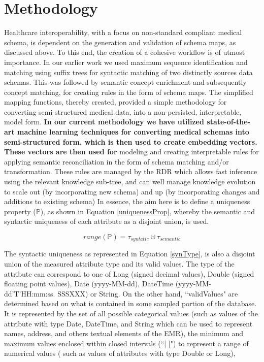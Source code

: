 
\section*{Methodology}
\label{methodology}
Healthcare interoperability, with a focus on non-standard compliant medical schema, is dependent on the generation and validation of schema maps, as discussed above. To this end, the creation of a cohesive workflow is of utmost importance. In our earlier work \cite{Satti2020} we used maximum sequence identification and matching using suffix trees for syntactic matching of two distinctly sources data schemas. This was followed by semantic concept enrichment and subsequently concept matching, for creating rules in the form of schema maps. The simplified mapping functions, thereby created, provided a simple methodology for converting semi-structured medical data, into a non-persisted, interpretable, model form.
\textbf{In our current methodology we have utilized state-of-the-art machine learning techniques for converting medical schemas into semi-structured form, which is then used to create embedding vectors. These vectors are then used for} modeling and creating interpretable rules for applying semantic reconciliation in the form of schema matching and/or transformation. These rules are managed by the RDR which allows fast inference using the relevant knowledge sub-tree, and can well manage knowledge evolution to scale out (by incorporating new schema) and up (by incorporating changes and additions to existing schema)
In essence, the aim here is to define a uniqueness property ($\mathbb{P}$), as shown in Equation \eqref{uniquenessProp}, whereby the semantic and syntactic uniqueness of each attribute as a disjoint union, is used.

\begin{equation}\label{uniquenessProp}
range(\mathbb{P})= \tau_{syntatic} \uplus \tau_{semantic}
\end{equation}

The syntactic uniqueness as represented in Equation \eqref{synType}, is also a disjoint union of the measured attribute type and its valid values. The type of the attribute can correspond to one of Long (signed decimal values), Double (signed floating point values), Date (yyyy-MM-dd), DateTime (yyyy-MM-dd'T'HH:mm:ss. SSSXXX) or String. On the other hand, ``validValues" are determined based on what is contained in some sampled portion of the database. It is represented by the set of all possible categorical values (such as values of the attribute with type Date, DateTime, and String which can be used to represent names, address, and others textual elements of the EMR), the minimum and maximum values enclosed within closed intervals (``[ ]") to represent a range of numerical values ( such as values of attributes with type Double or Long),

